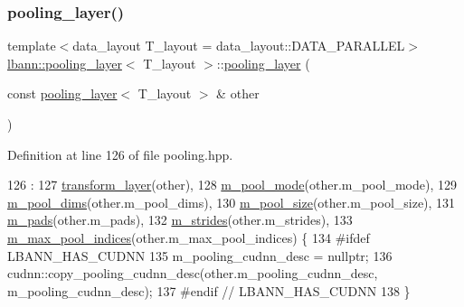 \subsubsection{\texorpdfstring{pooling\+\_\+layer()}{pooling\_layer()}\hspace{0.1cm}{\footnotesize\ttfamily [3/3]}}
{\footnotesize\ttfamily template$<$data\+\_\+layout T\+\_\+layout = data\+\_\+layout\+::\+D\+A\+T\+A\+\_\+\+P\+A\+R\+A\+L\+L\+EL$>$ \\
\hyperlink{classlbann_1_1pooling__layer}{lbann\+::pooling\+\_\+layer}$<$ T\+\_\+layout $>$\+::\hyperlink{classlbann_1_1pooling__layer}{pooling\+\_\+layer} (\begin{DoxyParamCaption}\item[{const \hyperlink{classlbann_1_1pooling__layer}{pooling\+\_\+layer}$<$ T\+\_\+layout $>$ \&}]{other }\end{DoxyParamCaption})\hspace{0.3cm}{\ttfamily [inline]}}



Definition at line 126 of file pooling.\+hpp.


\begin{DoxyCode}
126                                             :
127     \hyperlink{classlbann_1_1transform__layer_a4b72501e0f4d0745c8b13c5331055e65}{transform\_layer}(other),
128     \hyperlink{classlbann_1_1pooling__layer_a7b19407c88f89757e64ed3d4afab8443}{m\_pool\_mode}(other.m\_pool\_mode),
129     \hyperlink{classlbann_1_1pooling__layer_abb52fe974f602921823a46320fd7d075}{m\_pool\_dims}(other.m\_pool\_dims),
130     \hyperlink{classlbann_1_1pooling__layer_a8b3a9020bb896a1132c9823bc2c73515}{m\_pool\_size}(other.m\_pool\_size),
131     \hyperlink{classlbann_1_1pooling__layer_a22fd39aa4358149110a369ddf0e5ffdb}{m\_pads}(other.m\_pads),
132     \hyperlink{classlbann_1_1pooling__layer_a754bb6d49b39e915f315ca0049c953d9}{m\_strides}(other.m\_strides),
133     \hyperlink{classlbann_1_1pooling__layer_a58683798db4c48175cbad5ec32ff676c}{m\_max\_pool\_indices}(other.m\_max\_pool\_indices) \{
134 \textcolor{preprocessor}{  #ifdef LBANN\_HAS\_CUDNN}
135     m\_pooling\_cudnn\_desc = \textcolor{keyword}{nullptr};
136     cudnn::copy\_pooling\_cudnn\_desc(other.m\_pooling\_cudnn\_desc, m\_pooling\_cudnn\_desc);
137 \textcolor{preprocessor}{  #endif // LBANN\_HAS\_CUDNN}
138   \}
\end{DoxyCode}
\mbox{\label{classlbann_1_1pooling__layer_acdd563bbeab301496456dfb058fcb640}} 
